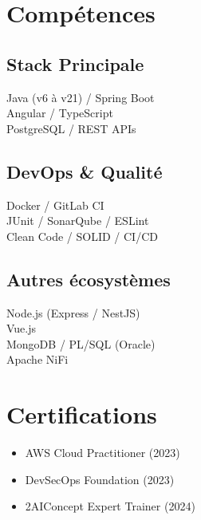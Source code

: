 \documentclass[a4paper,10pt]{article}
\begin{document}
\noindent
\begin{minipage}[t]{0.3\textwidth}
  \section*{Compétences}
  \begin{tcolorbox}[cvbox, width=\linewidth]
      \subsection*{Stack Principale}
      {\normalsize
      Java (v6 à v21) / Spring Boot \\
      Angular / TypeScript \\
      PostgreSQL / REST APIs
      } \\[0.5em]
      
      \subsection*{DevOps \& Qualité}
      {\normalsize
      Docker / GitLab CI \\
      JUnit / SonarQube / ESLint \\
      Clean Code / SOLID / CI/CD
      } \\[0.5em]

      \subsection*{Autres écosystèmes}
      {\normalsize
      Node.js (Express / NestJS) \\
      Vue.js \\
      MongoDB / PL/SQL (Oracle) \\
      Apache NiFi
      }
  \end{tcolorbox}

  \section*{Certifications}
  \begin{tcolorbox}[cvbox, width=\linewidth]
    \begin{itemize}[leftmargin=*]
      \item AWS Cloud Practitioner (2023)
      \item DevSecOps Foundation (2023)
      \item 2AIConcept Expert Trainer (2024)
    \end{itemize}
  \end{tcolorbox}


\end{minipage}
\end{document}
